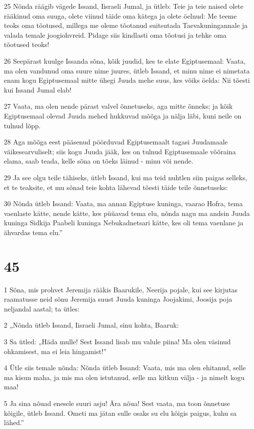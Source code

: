\par 25 Nõnda räägib vägede Issand, Iisraeli Jumal, ja ütleb: Teie ja teie naised olete rääkinud oma suuga, olete viinud täide oma kätega ja olete öelnud: Me teeme teoks oma tõotused, millega me oleme tõotanud suitsutada Taevakuningannale ja valada temale joogiohvreid. Pidage siis kindlasti oma tõotusi ja tehke oma tõotused teoks!
\par 26 Seepärast kuulge Issanda sõna, kõik juudid, kes te elate Egiptusemaal: Vaata, ma olen vandunud oma suure nime juures, ütleb Issand, et minu nime ei nimetata enam kogu Egiptusemaal mitte ühegi Juuda mehe suus, kes võiks öelda: Nii tõesti kui Issand Jumal elab!
\par 27 Vaata, ma olen nende pärast valvel õnnetuseks, aga mitte õnneks; ja kõik Egiptusemaal olevad Juuda mehed hukkuvad mõõga ja nälja läbi, kuni neile on tulnud lõpp.
\par 28 Aga mõõga eest pääsenud pöörduvad Egiptusemaalt tagasi Juudamaale väikesearvuliselt; siis kogu Juuda jääk, kes on tulnud Egiptusemaale võõraina elama, saab teada, kelle sõna on tõeks läinud - minu või nende.
\par 29 Ja see olgu teile tähiseks, ütleb Issand, kui ma teid nuhtlen siin paigas selleks, et te teaksite, et mu sõnad teie kohta lähevad tõesti täide teile õnnetuseks:
\par 30 Nõnda ütleb Issand: Vaata, ma annan Egiptuse kuninga, vaarao Hofra, tema vaenlaste kätte, nende kätte, kes püüavad tema elu, nõnda nagu ma andsin Juuda kuninga Sidkija Paabeli kuninga Nebukadnetsari kätte, kes oli tema vaenlane ja ähvardas tema elu.”

\chapter{45}

\par 1 Sõna, mis prohvet Jeremija rääkis Baarukile, Neerija pojale, kui see kirjutas raamatusse neid sõnu Jeremija suust Juuda kuninga Joojakimi, Joosija poja neljandal aastal; ta ütles:
\par 2 „Nõnda ütleb Issand, Iisraeli Jumal, sinu kohta, Baaruk:
\par 3 Sa ütled: „Häda mulle! Sest Issand lisab mu valule piina! Ma olen väsinud ohkamisest, ma ei leia hingamist!”
\par 4 Ütle siis temale nõnda: Nõnda ütleb Issand: Vaata, mis ma olen ehitanud, selle ma kisun maha, ja mis ma olen istutanud, selle ma kitkun välja - ja nimelt kogu maa!
\par 5 Ja sina nõuad enesele suuri asju! Ära nõua! Sest vaata, ma toon õnnetuse kõigile, ütleb Issand. Ometi ma jätan sulle osaks su elu kõigis paigus, kuhu sa lähed.”

